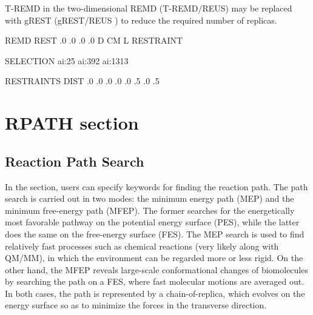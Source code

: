 \documentclass[a4paper,11pt,oneside,english]{sphinxmanual}
\begin{document}
T-REMD in the two-dimensional REMD (T-REMD/REUS) may
be replaced with gREST (gREST/REUS ) to reduce the required number of replicas.

\begin{sphinxVerbatim}[commandchars=\\\{\}]
\PYG{o}{[}REMD\PYG{o}{]}
        
  
            REST
        
      .0 .0 .0 .0  
      D CM L                   
    
            RESTRAINT
        
   

\PYG{o}{[}SELECTION\PYG{o}{]}
           ai:25
           ai:392
           ai:1\PYGZhy{}313

\PYG{o}{[}RESTRAINTS\PYG{o}{]}
       
        DIST
         .0   .0   .0   .0
       .0  .5  .0  .5
     
\end{sphinxVerbatim}


\chapter{RPATH section}
\label{\detokenize{15_RPath:rpath-section}}\label{\detokenize{15_RPath:rpath}}\label{\detokenize{15_RPath::doc}}

\section{Reaction Path Search}
\label{\detokenize{15_RPath:reaction-path-search}}
In the \sphinxstylestrong{{[}RPATH{]}} section, users can specify keywords for finding the
reaction path. The path search is carried out in two modes: the
minimum energy path (MEP) and the minimum free-energy path (MFEP).
The former searches for the energetically most favorable pathway on the
potential energy surface (PES), while the latter does the same on the
free-energy surface (FES).
The MEP search is used to find relatively fast
processes such as chemical reactions (very likely along with QM/MM), in
which the environment can be regarded more or less rigid.
On the other hand, the MFEP reveals large-scale conformational changes
of biomolecules by searching the path on a FES, where fast molecular
motions are averaged out.
In both cases, the path is
represented by a chain-of-replica, which evolves on the energy surface
so as to minimize the forces in the transverse direction.
\end{document}

